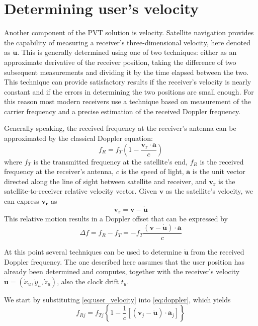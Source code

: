 \section{Determining user's velocity}
Another component of the PVT solution is velocity. Satellite navigation provides
the capability of measuring a receiver's three-dimensional velocity, here
denoted as $\bm{\dot u}$. This is generally determined using one of two
techniques: either as an approximate derivative of the receiver position, taking
the difference of two subsequent measurements and dividing it by the time
elapsed between the two. This technique can provide satisfactory results if the
receiver's velocity is nearly constant and if the errors in determining the two
positions are small enough. For this reason most modern receivers use a
technique based on measurement of the carrier frequency and a precise estimation
of the received Doppler frequency.

\par

Generally speaking, the received frequency at the receiver's antenna can be
approximated by the classical Doppler equation:
\begin{equation} \label{eq:doppler}
  f_R = f_T \left(1-\frac{\bm{v_r} \cdot \bm{a}}{c}\right)
\end{equation}
where $f_T$ is the transmitted frequency at the satellite's end, $f_R$ is the
received frequency at the receiver's antenna, $c$ is the speed of light,
$\bm{a}$ is the unit vector directed along the line of sight between satellite
and receiver, and $\bm{v_r}$ is the satellite-to-receiver relative velocity
vector. Given $\bm{v}$ as the satellite's velocity, we can express $\bm{v_r}$ as
\begin{equation} \label{eq:user_velocity}
  \bm{v_r} = \bm{v} - \bm{\dot u}
\end{equation}
This relative motion results in a Doppler offset that can be expressed by
\begin{equation}
  \Delta f = f_R - f_T = -f_T \frac{(\bm{v} - \bm{\dot u}) \cdot \bm{a}}{c}
\end{equation}

At this point several techniques can be used to determine $\bm{\dot u}$ from the
received Doppler frequency. The one described here assumes that the user
position has already been determined and computes, together with the receiver's
velocity $\bm{\dot u} = (\dot x_u, \dot y_u, \dot z_u)$, also the clock drift
$\dot t_u$.

We start by substituting \ref{eq:user_velocity} into \ref{eq:doppler}, which
yields
\begin{equation} \label{eq:doppler2}
  f_{Rj} = f_{Tj}\left\{ 1-\frac{1}{c}\left[ \left( \bm{v}_j - \bm{\dot u} \right) \cdot \bm{a}_j \right] \right\} 
\end{equation} 

